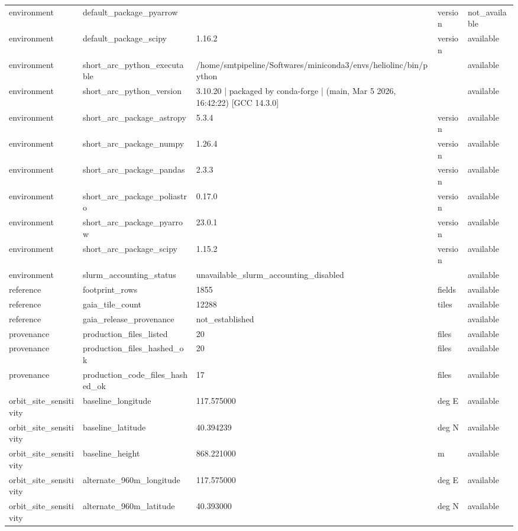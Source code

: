 \begin{tabular}{lllll}
environment & default\_package\_pyarrow &  & version & not\_available \\
environment & default\_package\_scipy & 1.16.2 & version & available \\
environment & short\_arc\_python\_executable & /home/smtpipeline/Softwares/miniconda3/envs/heliolinc/bin/python &  & available \\
environment & short\_arc\_python\_version & 3.10.20 | packaged by conda-forge | (main, Mar  5 2026, 16:42:22) [GCC 14.3.0] &  & available \\
environment & short\_arc\_package\_astropy & 5.3.4 & version & available \\
environment & short\_arc\_package\_numpy & 1.26.4 & version & available \\
environment & short\_arc\_package\_pandas & 2.3.3 & version & available \\
environment & short\_arc\_package\_poliastro & 0.17.0 & version & available \\
environment & short\_arc\_package\_pyarrow & 23.0.1 & version & available \\
environment & short\_arc\_package\_scipy & 1.15.2 & version & available \\
environment & slurm\_accounting\_status & unavailable\_slurm\_accounting\_disabled &  & available \\
reference & footprint\_rows & 1855 & fields & available \\
reference & gaia\_tile\_count & 12288 & tiles & available \\
reference & gaia\_release\_provenance & not\_established &  & available \\
provenance & production\_files\_listed & 20 & files & available \\
provenance & production\_files\_hashed\_ok & 20 & files & available \\
provenance & production\_code\_files\_hashed\_ok & 17 & files & available \\
orbit\_site\_sensitivity & baseline\_longitude & 117.575000 & deg E & available \\
orbit\_site\_sensitivity & baseline\_latitude & 40.394239 & deg N & available \\
orbit\_site\_sensitivity & baseline\_height & 868.221000 & m & available \\
orbit\_site\_sensitivity & alternate\_960m\_longitude & 117.575000 & deg E & available \\
orbit\_site\_sensitivity & alternate\_960m\_latitude & 40.393000 & deg N & available \\

\end{tabular}

